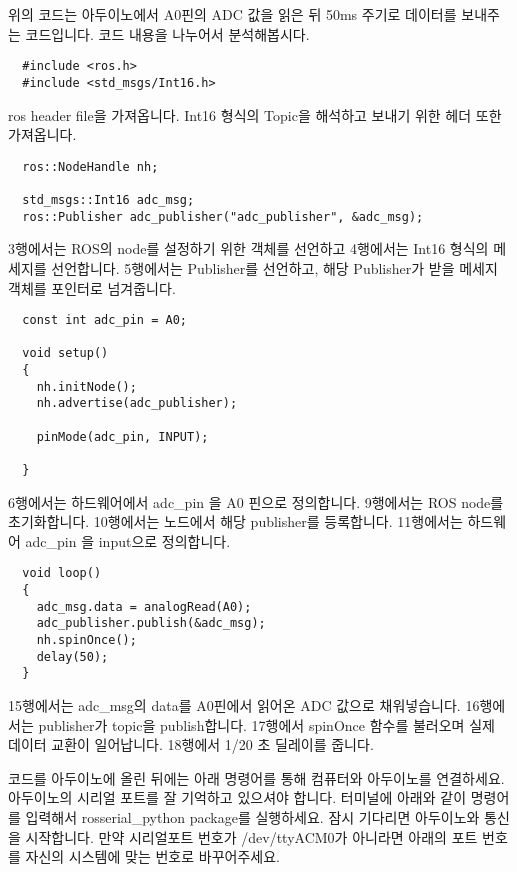 \documentclass[11pt,fleqn]{book} %
\begin{document}
위의 코드는 아두이노에서 A0핀의 ADC 값을 읽은 뒤 50ms 주기로 데이터를 보내주는 코드입니다.
코드 내용을 나누어서 분석해봅시다.

\begin{verbatim}
  #include <ros.h>
  #include <std_msgs/Int16.h>
\end{verbatim}

ros header file을 가져옵니다. Int16 형식의 Topic을 해석하고 보내기 위한 헤더 또한 가져옵니다.

\begin{verbatim}
  ros::NodeHandle nh;

  std_msgs::Int16 adc_msg;
  ros::Publisher adc_publisher("adc_publisher", &adc_msg);
\end{verbatim}

3행에서는 ROS의 node를 설정하기 위한 객체를 선언하고
4행에서는 Int16 형식의 메세지를 선언합니다.
5행에서는 Publisher를 선언하고, 해당 Publisher가 받을 메세지 객체를 포인터로 넘겨줍니다.

\begin{verbatim}
  const int adc_pin = A0;

  void setup()
  {
    nh.initNode();
    nh.advertise(adc_publisher);

    pinMode(adc_pin, INPUT);

  }
\end{verbatim}

6행에서는 하드웨어에서 adc\_pin 을 A0 핀으로 정의합니다.
9행에서는 ROS node를 초기화합니다.
10행에서는 노드에서 해당 publisher를 등록합니다.
11행에서는 하드웨어 adc\_pin 을 input으로 정의합니다.

\begin{verbatim}
  void loop()
  {
    adc_msg.data = analogRead(A0);
    adc_publisher.publish(&adc_msg);
    nh.spinOnce();
    delay(50);
  }
\end{verbatim}

15행에서는 adc\_msg의 data를 A0핀에서 읽어온 ADC 값으로 채워넣습니다.
16행에서는 publisher가 topic을 publish합니다.
17행에서 spinOnce 함수를 불러오며 실제 데이터 교환이 일어납니다.
18행에서 1/20 초 딜레이를 줍니다.

코드를 아두이노에 올린 뒤에는 아래 명령어를 통해 컴퓨터와 아두이노를 연결하세요. 아두이노의 시리얼 포트를 잘 기억하고 있으셔야 합니다.
터미널에 아래와 같이 명령어를 입력해서 rosserial\_python package를 실행하세요. 잠시 기다리면 아두이노와 통신을 시작합니다.
만약 시리얼포트 번호가 /dev/ttyACM0가 아니라면 아래의 포트 번호를 자신의 시스템에 맞는 번호로 바꾸어주세요.
\end{document}
